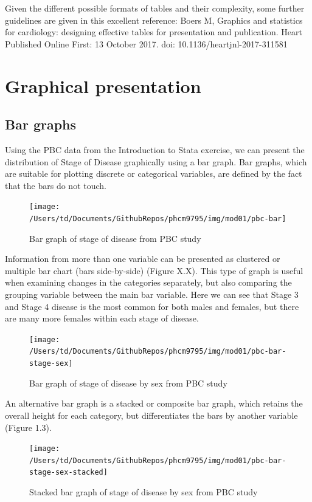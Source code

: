 \documentclass[
]{memoir}
\begin{document}
Given the different possible formats of tables and their complexity, some further guidelines are given in this excellent reference: Boers M, Graphics and statistics for cardiology: designing effective tables for presentation and publication. Heart Published Online First: 13 October 2017. doi: 10.1136/heartjnl-2017-311581

\hypertarget{graphical-presentation}{%
\section{Graphical presentation}\label{graphical-presentation}}

\hypertarget{bar-graphs}{%
\subsection{Bar graphs}\label{bar-graphs}}

Using the PBC data from the Introduction to Stata exercise, we can present the distribution of Stage of Disease graphically using a bar graph. Bar graphs, which are suitable for plotting discrete or categorical variables, are defined by the fact that the bars do not touch.

\begin{figure}
\texttt{[image: /Users/td/Documents/GithubRepos/phcm9795/img/mod01/pbc-bar]} \caption{Bar graph of stage of disease from PBC study}\label{fig:fig-1-1}
\end{figure}

Information from more than one variable can be presented as clustered or multiple bar chart (bars side-by-side) (Figure X.X). This type of graph is useful when examining changes in the categories separately, but also comparing the grouping variable between the main bar variable. Here we can see that Stage 3 and Stage 4 disease is the most common for both males and females, but there are many more females within each stage of disease.

\begin{figure}
\texttt{[image: /Users/td/Documents/GithubRepos/phcm9795/img/mod01/pbc-bar-stage-sex]} \caption{Bar graph of stage of disease by sex from PBC study}\label{fig:fig-1-2}
\end{figure}

An alternative bar graph is a stacked or composite bar graph, which retains the overall height for each category, but differentiates the bars by another variable (Figure 1.3).

\begin{figure}
\texttt{[image: /Users/td/Documents/GithubRepos/phcm9795/img/mod01/pbc-bar-stage-sex-stacked]} \caption{Stacked bar graph of stage of disease by sex from PBC study}\label{fig:fig-1-3}
\end{figure}
\end{document}
